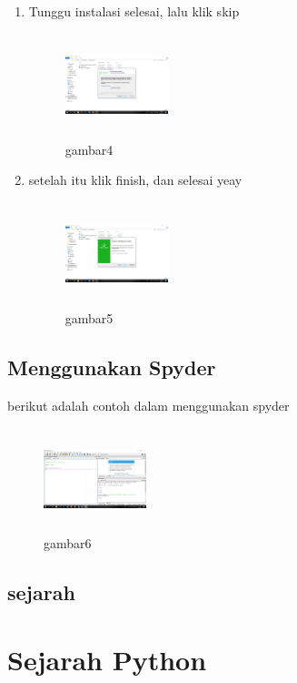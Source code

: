 \begin{enumerate}
    \item Tunggu instalasi selesai, lalu klik skip
    \begin{figure}[!htbp]
        \centering
        \includegraphics[width=3cm,height=3cm]{figures/4.png}
        \caption{gambar4}
        \label{skip}
        \end{figure}

    \item setelah itu klik finish, dan selesai yeay
    \begin{figure}[!htbp]
        \centering
        \includegraphics[width=3cm,height=3cm]{figures/5.png}
        \caption{gambar5}
        \label{selesai}
        \end{figure}
\end{enumerate}

\subsection{Menggunakan Spyder}
berikut adalah contoh dalam menggunakan spyder
\begin{figure}[!htbp]
    \centering
    \includegraphics[width=3cm,height=3cm]{figures/6.png}
    \caption{gambar6}
    \label{spyder}
    \end{figure}
	
\subsection{sejarah}
\section{Sejarah Python}


